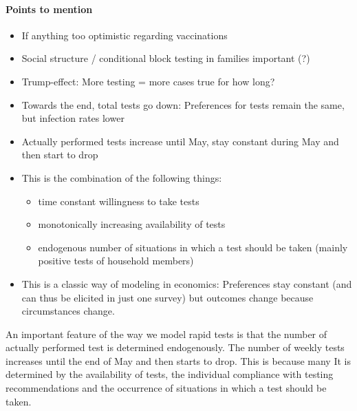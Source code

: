 \paragraph{Points to mention}
\begin{itemize}
    \item If anything too optimistic regarding vaccinations
    \item Social structure / conditional block testing in families important (?)
    \item Trump-effect: More testing = more cases true for how long?
    \item Towards the end, total tests go down: Preferences for tests remain the same,
          but infection rates lower 
    \item Actually performed tests increase until May, stay constant during May and then
    start to drop
    \item This is the combination of the following things:
          \begin{itemize}
              \item time constant willingness to take tests
              \item monotonically increasing availability of tests
              \item endogenous number of situations in which a test should be taken
              (mainly positive tests of household members)
          \end{itemize}
    \item This is a classic way of modeling in economics: Preferences stay constant (and
          can thus be elicited in just one survey) but outcomes change because
          circumstances change.

\end{itemize}


An important feature of the way we model rapid tests is that the number of actually
performed test is determined endogenously. The number of weekly tests increases until
the end of May and then starts to drop. This is because many  It is determined by the
availability of tests, the individual compliance with testing recommendations and the
occurrence of situations in which a test should be taken.







